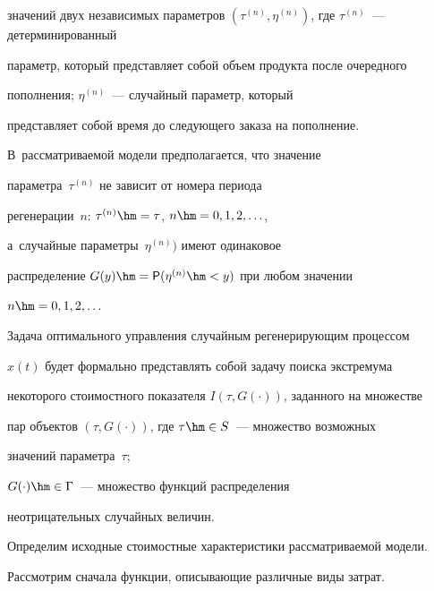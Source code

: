 значений двух независимых параметров $(\tau^{({n})}, 

\eta^{({n})})$, где $\tau^{({n})}$~--- детерминированный 

параметр, который представляет собой объем продукта после очередного 

пополнения; $\eta^{({n})}$~--- случайный параметр, который 

представляет собой время до следующего заказа на пополнение. 

В~рассматриваемой модели предполагается, что значение 

параметра~$\tau^{({n})}$ не зависит от номера периода 

регенерации~$n$: $\tau^{({n})}\hm= \tau$, $n\hm=0,1,2,\ldots$, 

а~случайные параметры~$\eta^{({n})})$ имеют одинаковое 

распределение $G(y)\hm= {{\sf P}}(\eta^{({n})}\hm<y)$ при любом значении 

$n\hm=0,1,2,\ldots$

  

  Задача оптимального управления случайным регенерирующим процессом 

$x(t)$ будет формально представлять собой задачу поиска экстремума 

некоторого стоимостного показателя $I(\tau, G(\cdot))$, заданного на множестве 

пар объектов $(\tau, G(\cdot))$, где $\tau\hm\in S$~---  множество возможных 

значений параметра~$\tau$;

  $G(\cdot)\hm\in \Gamma$~--- множество функций распределения 

неотрицательных случайных величин.

  

  Определим исходные стоимостные характеристики рассматриваемой модели.

  

  Рассмотрим сначала функции, описывающие различные виды затрат. 

